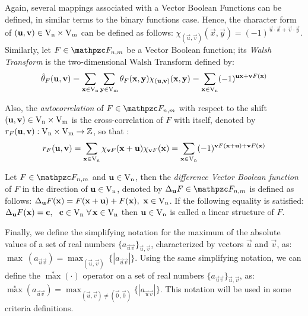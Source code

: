 Again, several mappings associated with a Vector Boolean Functions can be
defined, in similar terms to the binary functions case. Hence, the character 
form of $(\vec{u},\vec{v}) \in \gf{V_n} \times \gf{V_m}$ can be defined as
follows: $\chi_{(\vec{u},\vec{v})}(\vec{x},\vec{y}) = {(-1)}^{\vec{u} \cdot
  \vec{x} + \vec{v} \cdot \vec{y}}$. Similarly, let $F \in \funct{F}_{n,m}$ be
a Vector Boolean function; its \textsl{Walsh 
  Transform} is the two-dimensional Walsh Transform defined by:
\begin{equation}\label{WalshTransformInnerVector}
\walsh{\theta}_F(\vec{u}, \vec{v}) = \sum_{\vec{x} \in \gf{V_n}} \sum_{\vec{y} \in \gf{V_m}} \theta_F(\vec{x},\vec{y}) \chi_{(\vec{u},\vec{v})}(\vec{x},\vec{y})
= \sum_{\vec{x} \in \gf{V_n}} (-1)^{\vec{u}\vec{x} + \vec{v} F(\vec{x})} 
\end{equation}

Also, the \textsl{autocorrelation} of $F \in \funct{F}_{n,m}$
with respect to the shift $(\vec{u},\vec{v}) \in \gf{V_n} \times \gf{V_m}$ is
the cross-correlation of $F$ with itself, denoted by $\R_F(\vec{u},\vec{v}):
\gf{V_n} \times \gf{V_m} \to \bbbz$, so that \cite{fse-Nyberg:94}:  
\begin{equation}\label{eq:AutocorrelationVBF}
\R_F(\vec{u},\vec{v}) = \sum_{\vec{x} \in \gf{V_n}}
\chi_{\vec{v} F}(\vec{x} + \vec{u}) \chi_{\vec{v} F}(\vec{x})
= \sum_{\vec{x} \in \gf{V_n}} (-1)^{\vec{v} F(\vec{x} + \vec{u}) + \vec{v} F(\vec{x})} 
\end{equation}

Let $F \in \funct{F}_{n,m}$ and $\vec{u} \in \gf{V_n}$, then the
\textsl{difference Vector Boolean function} of $F$ in the direction of
$\vec{u} \in \gf{V_n}$, denoted by $\Delta_{\vec{u}}F \in \funct{F}_{n,m}$ is
defined as follows: $\Delta_{\vec{u}}F(\vec{x})=F(\vec{x}+\vec{u})+F(\vec{x}),
\  \vec{x} \in \gf{V_n}$. If the following equality is satisfied:
$\Delta_{\vec{u}}F(\vec{x})=\vec{c}, \  \ \vec{c} \in \gf{V_n} \ \fa \vec{x}
\in \gf{V_n}$ then $\vec{u} \in \gf{V_n}$ is called a linear structure of
$F$. 

Finally, we define the simplifying notation for the maximum
of the absolute values of a 
set of real numbers  $\{a_{\vec{u}\vec{v}}\}_{\vec{u},\vec{v}}$, characterized
by vectors $\vec{u}$ and $\vec{v}$, as: $\max \ (a_{\vec{u}\vec{v}})=
\max_{(\vec{u},\vec{v})}\ \{|a_{\vec{u}\vec{v}}|\}$. Using the same
simplifying notation, we can define the $\stackrel{*}{\max}(\cdot)$ operator on a
set of real numbers  $\{a_{\vec{u}\vec{v}}\}_{\vec{u},\vec{v}}$, as:
$\stackrel{*}{\max}(a_{\vec{u}\vec{v}})=\max_{(\vec{u},\vec{v})\neq(\vec{0},\vec{0})}\{|a_{\vec{u}\vec{v}}|\}$.
This notation will be used in some criteria definitions. 

